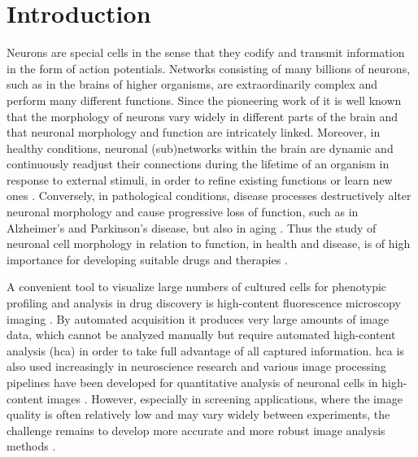 \section{Introduction}
\label{ch5:sec:intro}

Neurons are special cells in the sense that they codify and transmit information in the form of action potentials. Networks consisting of many billions of neurons, such as in the brains of higher organisms, are extraordinarily complex and perform many different functions. Since the pioneering work of \cite{ramon2008histologia} it is well known that the morphology of neurons vary widely in different parts of the brain and that neuronal morphology and function are intricately linked. Moreover, in healthy conditions, neuronal (sub)networks within the brain are dynamic and continuously readjust their connections during the lifetime of an organism in response to external stimuli, in order to refine existing functions or learn new ones \cite{ascoli2015trees}. Conversely, in pathological conditions, disease processes destructively alter neuronal morphology and cause progressive loss of function, such as in Alzheimer's and Parkinson's disease, but also in aging \cite{van2001need}. Thus the study of neuronal cell morphology in relation to function, in health and disease, is of high importance for developing suitable drugs and therapies \cite{meijering2010neuron}.

A convenient tool to visualize large numbers of cultured cells for phenotypic profiling and analysis in drug discovery is high-content fluorescence microscopy imaging \cite{xia2012concise, antony2013light, singh2014increasing, bougen2017large}. By automated acquisition it produces very large amounts of image data, which cannot be analyzed manually but require automated high-content analysis (\gls{hca}) in order to take full advantage of all captured information. \gls{hca} is also used increasingly in neuroscience research \cite{dragunow2008high, anderl2009neuronal, jain2012high} and various image processing pipelines have been developed for quantitative analysis of neuronal cells in high-content images \cite{vallotton2007automated, zhang2007novel, wu2010automatic, dehmelt2011neuritequant, radio2012neurite, charoenkwan2013hcs, smafield2015automatic}. However, especially in screening applications, where the image quality is often relatively low and may vary widely between experiments, the challenge remains to develop more accurate and more robust image analysis methods \cite{sommer2013machine, kraus2016computer, meijering2016imagining}.

